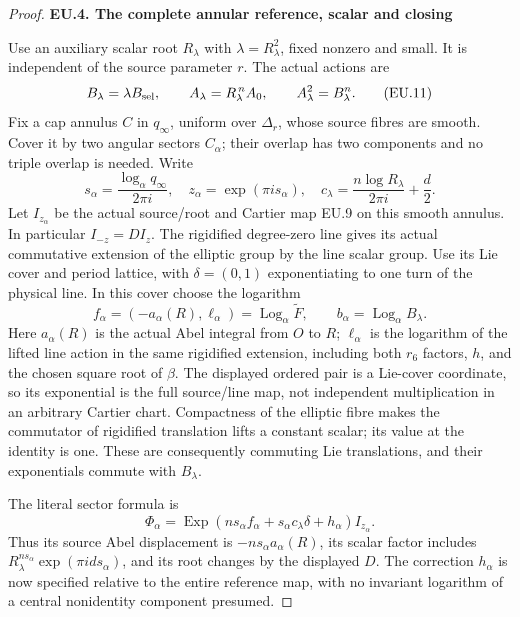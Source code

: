 \begin{proof}
\par

\medskip\noindent\textbf{EU.4. The complete annular reference, scalar and closing}

\par\nobreak

Use an auxiliary scalar root \(R_\lambda\) with
\(\lambda=R_\lambda^2\), fixed nonzero and small. It is independent
of the source parameter \(r\). The actual actions are
\[
 B_\lambda=\lambda B_{\rm sel},\qquad
 A_{\lambda}=R_\lambda^{\,n}A_0,\qquad
 A_\lambda^2=B_\lambda^n.
 \tag{EU.11}
\]
Fix a cap annulus \(C\) in \(q_\infty\), uniform over
\(\Delta_r\), whose source fibres are smooth. Cover it by two angular
sectors \(C_\alpha\); their overlap has two components and no triple
overlap is needed. Write
\[
 s_\alpha=\frac{\log_\alpha q_\infty}{2\pi i},\quad
 z_\alpha=\exp(\pi i s_\alpha),\quad
 c_\lambda=\frac{n\log R_\lambda}{2\pi i}+\frac d2.
 \tag{EU.11a}
\]
Let \(I_{z_\alpha}\) be the actual source/root and Cartier map
EU.9 on this smooth annulus. In particular
\(I_{-z}=D I_z\). The rigidified degree-zero line gives its actual
commutative extension of the elliptic group by the line scalar group.
Use its Lie cover and period lattice, with
\(\delta=(0,1)\) exponentiating to one turn of the physical line.
In this cover choose the logarithm
\[
 f_\alpha=(-a_\alpha(R),\ell_\alpha)
       =\operatorname{Log}_\alpha\widetilde F,
 \qquad b_\alpha=\operatorname{Log}_\alpha B_\lambda.
 \tag{EU.11b}
\]
Here \(a_\alpha(R)\) is the actual Abel integral from \(O\) to
\(R\); \(\ell_\alpha\) is the logarithm of the lifted line action
in the same rigidified extension, including both \(r_6\) factors,
\(h\), and the chosen square root of \(\beta\). The displayed
ordered pair is a Lie-cover coordinate, so its exponential is the
full source/line map, not independent multiplication in an arbitrary
Cartier chart. Compactness of the elliptic fibre makes the commutator
of rigidified translation lifts a constant scalar; its value at the
identity is one. These are consequently commuting Lie translations,
and their exponentials commute with \(B_\lambda\).

The literal sector formula is
\[
 \Phi_\alpha
   =\operatorname{Exp}\!\left(
       n s_\alpha f_\alpha+s_\alpha c_\lambda\delta
                         +h_\alpha\right)I_{z_\alpha}.
 \tag{EU.11c}
\]
Thus its source Abel displacement is
\(-n s_\alpha a_\alpha(R)\), its scalar factor includes
\(R_\lambda^{n s_\alpha}\exp(\pi i d s_\alpha)\), and its
root changes by the displayed \(D\). The correction \(h_\alpha\)
is now specified relative to the entire reference map, with no
invariant logarithm of a central nonidentity component presumed.


\end{proof}
